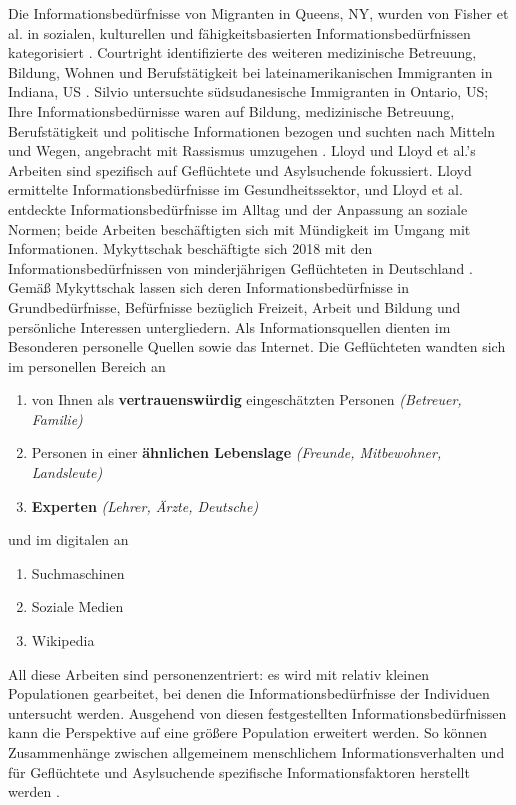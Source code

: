 Die Informationsbedürfnisse von Migranten in Queens, NY, wurden von Fisher et al. in sozialen, kulturellen und fähigkeitsbasierten Informationsbedürfnissen kategorisiert \citep{fisher2004information}.\newline
Courtright identifizierte des weiteren medizinische Betreuung, Bildung, Wohnen und Berufstätigkeit bei lateinamerikanischen Immigranten in Indiana, US \citep{courtright2005health}.\newline 
Silvio untersuchte südsudanesische Immigranten in Ontario, US; Ihre Informationsbedürnisse waren auf Bildung, medizinische Betreuung, Berufstätigkeit und politische Informationen bezogen und suchten nach Mitteln und Wegen, angebracht mit Rassismus umzugehen \citep{hakim2006information}.\newline
Lloyd\citep{lloyd2014building} und Lloyd et al.\citep{lloyd2013connecting}'s Arbeiten sind spezifisch auf Geflüchtete und Asylsuchende fokussiert. Lloyd ermittelte Informationsbedürfnisse im Gesundheitssektor, und Lloyd et al. entdeckte Informationsbedürfnisse im Alltag und der Anpassung an soziale Normen; beide Arbeiten beschäftigten sich mit Mündigkeit im Umgang mit Informationen.\newline
Mykyttschak beschäftigte sich 2018 mit den Informationsbedürfnissen von minderjährigen Geflüchteten in Deutschland \citep{mykyttschak2018}. 
Gemäß Mykyttschak lassen sich deren Informationsbedürfnisse in Grundbedürfnisse, Befürfnisse bezüglich Freizeit, Arbeit und Bildung und persönliche Interessen untergliedern. Als Informationsquellen dienten im Besonderen personelle Quellen sowie das Internet. Die Geflüchteten wandten sich im personellen Bereich an 
\begin{enumerate}
    \item  von Ihnen als \textbf{vertrauenswürdig} eingeschätzten Personen \textit{(Betreuer, Familie)}
    \item Personen in einer \textbf{ähnlichen Lebenslage} \textit{(Freunde, Mitbewohner, Landsleute)} \item\textbf{Experten} \textit{(Lehrer, Ärzte, Deutsche)} 
\end{enumerate}
und im digitalen an
\begin{enumerate}
    \item Suchmaschinen
    \item Soziale Medien
    \item Wikipedia
\end{enumerate}
All diese Arbeiten sind personenzentriert: es wird mit relativ kleinen Populationen gearbeitet, bei denen die Informationsbedürfnisse der Individuen untersucht werden. Ausgehend von diesen festgestellten Informationsbedürfnissen kann die Perspektive auf eine größere Population erweitert werden. So können Zusammenhänge zwischen allgemeinem menschlichem Informationsverhalten und für Geflüchtete und Asylsuchende spezifische Informationsfaktoren herstellt werden \citep{oduntan2017investigating}.\newline
